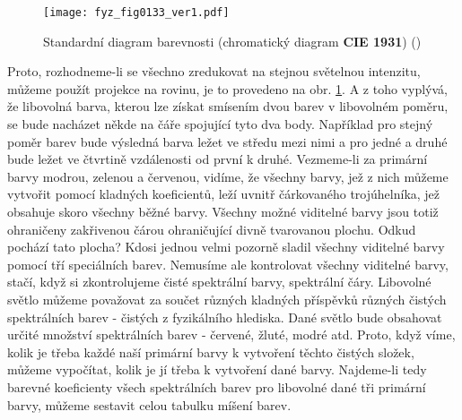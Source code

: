     \begin{figure}[ht!]  %
      \centering
      \texttt{[image: fyz\_fig0133\_ver1.pdf]}
      \caption{Standardní diagram barevnosti (chromatický diagram \textbf{CIE
       1931}\protect\footnotemark[5]) (\cite[s.~468]{Feynman01})}
      \label{fyz:fig0133}
    \end{figure}
    Proto, rozhodneme-li se všechno zredukovat na stejnou světelnou intenzitu, můžeme použít 
    projekce na rovinu, je to provedeno na obr. \ref{fyz:fig0133}. A z toho vyplývá, že libovolná 
    barva, kterou lze získat smísením dvou barev v libovolném poměru, se bude nacházet někde na 
    čáře spojující tyto dva body. Například pro stejný poměr barev bude výsledná barva ležet ve 
    středu mezi nimi a pro  jedné a  druhé bude ležet ve čtvrtině vzdálenosti od 
    první k druhé. Vezmeme-li za primární barvy modrou, zelenou a červenou, vidíme, že všechny 
    barvy, jež z nich můžeme vytvořit pomocí kladných koeficientů, leží uvnitř čárkovaného 
    trojúhelníka, jež obsahuje skoro všechny běžné barvy. Všechny možné viditelné barvy jsou totiž 
    ohraničeny zakřivenou čárou ohraničující divně tvarovanou plochu. Odkud pochází tato plocha? 
    Kdosi jednou velmi pozorně sladil všechny viditelné barvy pomocí tří speciálních barev. 
    Nemusíme ale kontrolovat všechny viditelné barvy, stačí, když si zkontrolujeme čisté spektrální 
    barvy, spektrální čáry. Libovolné světlo můžeme považovat za součet různých kladných příspěvků 
    různých čistých spektrálních barev - čistých z fyzikálního hlediska. Dané světlo bude obsahovat 
    určité množství spektrálních barev - červené, žluté, modré atd. Proto, když víme, kolik je 
    třeba každé naší primární barvy k vytvoření těchto čistých složek, můžeme vypočítat, kolik je 
    jí třeba k vytvoření dané barvy. Najdeme-li tedy barevné koeficienty všech spektrálních barev 
    pro libovolné dané tři primární barvy, můžeme sestavit celou tabulku míšení barev.


